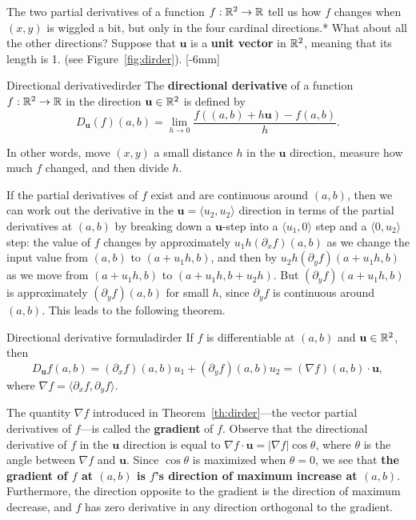 \documentclass[svgnames]{watsonbook}
\begin{document}
  The two partial derivatives of a function $f: \mathbb{R}^2 \to \mathbb{R}$ tell us
  how $f$ changes when $(x,y)$ is wiggled a bit, but only in the four
  cardinal directions.* What about all the other directions? Suppose
  that $\mathbf{u}$ is a \textbf{unit vector} in $\mathbb{R}^2$, meaning that its
  length is 1. (see
  Figure~\ref{fig:dirder}). [-6mm]

  \begin{defn}{Directional derivative}{dirder}
    The \textbf{directional derivative} of a function $f:\mathbb{R}^2 \to \mathbb{R}$
    in the direction $\mathbf{u} \in \mathbb{R}^2$ is defined by
    \[
      D_{\mathbf{u}}(f)(a,b) = \lim_{h \to 0}\frac{f( (a,b) + h
        \mathbf{u}) - f(a,b)}{h}. 
    \]  
  \end{defn}

  In other words, move $(x,y)$ a small distance $h$ in the
  $\mathbf{u}$ direction, measure how much $f$ changed, and then
  divide $h$.

  If the partial derivatives of $f$ exist and are continuous around
  $(a,b)$, then we can work out the derivative in the
  $\mathbf{u} = \langle u_2, u_2 \rangle$ direction in terms of the
  partial derivatives at $(a,b)$ by breaking down a $\mathbf{u}$-step
  into a $\langle u_1, 0\rangle$ step and a $\langle 0, u_2\rangle$
  step: the value of $f$ changes by approximately
  $u_1h (\partial_xf)(a,b)$ as we change the input value from $(a,b)$
  to $(a+u_1h, b)$, and then by $u_2h (\partial_yf)(a+u_1h,b)$ as we
  move from $(a+u_1h, b)$ to $(a+u_1h, b + u_2 h)$. But
  $(\partial_yf)(a+u_1h,b)$ is approximately
  $(\partial_yf)(a,b)$ for small $h$, since $\partial_y f$ is
  continuous around $(a,b)$. This leads to the following theorem.

  \begin{theo}{Directional derivative formula}{dirder}
    If $f$ is differentiable at $(a,b)$ and $ \mathbf{u}  \in \mathbb{R}^2$, then
    \[
      D_{\mathbf{u}} f(a,b) = (\partial_xf)(a,b)u_1 +
      (\partial_yf)(a,b)u_2 =  (\nabla f)(a,b) \cdot \mathbf{u}, 
    \]
    where $\nabla f = \langle \partial_x f, \partial_y f \rangle$. 
  \end{theo}

  The quantity $\nabla f$ introduced in Theorem~\ref{th:dirder}---the
  vector partial derivatives of $f$---is called the \textbf{gradient}
  of $f$. Observe that the directional derivative of $f$ in the
  $\mathbf{u}$ direction is equal to
  $\nabla f \cdot \mathbf{u} = |\nabla f| \cos \theta$, where $\theta$
  is the angle between $\nabla f$ and $\mathbf{u}$. Since $\cos\theta$
  is maximized when $\theta = 0$, we see that \textbf{the gradient of
    $f$ at $(a,b)$ is $f$'s direction of maximum increase at
    $(a,b)$}. Furthermore, the direction opposite to the gradient is
  the direction of maximum decrease, and $f$ has zero derivative in
  any direction orthogonal to the gradient.
\end{document}
